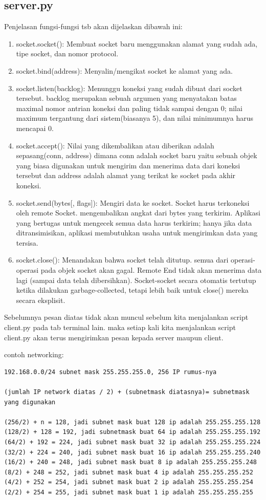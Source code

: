 \subsection{server.py}
Penjelasan fungsi-fungsi tsb akan dijelaskan dibawah ini:
\begin{enumerate}
 \item socket.socket(): Membuat socket baru menggunakan alamat yang sudah ada, tipe socket, dan nomor protocol.
 \item socket.bind(address): Menyalin/mengikat socket ke alamat yang ada.
 \item socket.listen(backlog): Menunggu koneksi yang sudah dibuat dari socket tersebut. backlog merupakan sebuah argumen yang menyatakan batas maximal nomor antrian koneksi dan paling tidak sampai dengan 0; nilai maximum tergantung dari sistem(biasanya 5), dan nilai minimumnya harus mencapai 0.
 \item socket.accept(): Nilai yang dikembalikan atau diberikan adalah sepasang(conn, address) dimana conn adalah socket baru yaitu sebuah objek yang biasa digunakan untuk mengirim dan menerima data dari koneksi tersebut dan address adalah alamat yang terikat ke socket pada akhir koneksi.
 \item socket.send(bytes[, flags]): Mengiri data ke socket. Socket harus terkoneksi oleh remote Socket. mengembalikan angkat dari bytes yang terkirim. Aplikasi yang bertugas untuk mengecek semua data harus terkirim; hanya jika data ditransimisikan, aplikasi membutuhkan usaha untuk mengirimkan data yang tersisa.
 \item socket.close(): Menandakan bahwa socket telah ditutup. semua dari operasi-operasi pada objek socket akan gagal. Remote End tidak akan menerima data lagi (sampai data telah dibersihkan). Socket-socket secara otomatis tertutup ketika dilakukan garbage-collected, tetapi lebih baik untuk close() mereka secara eksplisit.
\end{enumerate}
Sebelumnya pesan diatas tidak akan muncul sebelum kita menjalankan script client.py pada tab terminal lain.
maka setiap kali kita menjalankan script client.py akan terus mengirimkan pesan kepada server maupun client.

contoh networking:
\begin{verbatim}
192.168.0.0/24 subnet mask 255.255.255.0, 256 IP rumus-nya

(jumlah IP network diatas / 2) + (subnetmask diatasnya)= subnetmask yang digunakan

(256/2) + n = 128, jadi subnet mask buat 128 ip adalah 255.255.255.128
(128/2) + 128 = 192, jadi subnetmask buat 64 ip adalah 255.255.255.192
(64/2) + 192 = 224, jadi subnet mask buat 32 ip adalah 255.255.255.224
(32/2) + 224 = 240, jadi subnet mask buat 16 ip adalah 255.255.255.240
(16/2) + 240 = 248, jadi subnet mask buat 8 ip adalah 255.255.255.248
(8/2) + 248 = 252, jadi subnet mask buat 4 ip adalah 255.255.255.252
(4/2) + 252 = 254, jadi subnet mask buat 2 ip adalah 255.255.255.254
(2/2) + 254 = 255, jadi subnet mask buat 1 ip adalah 255.255.255.255
\end{verbatim}